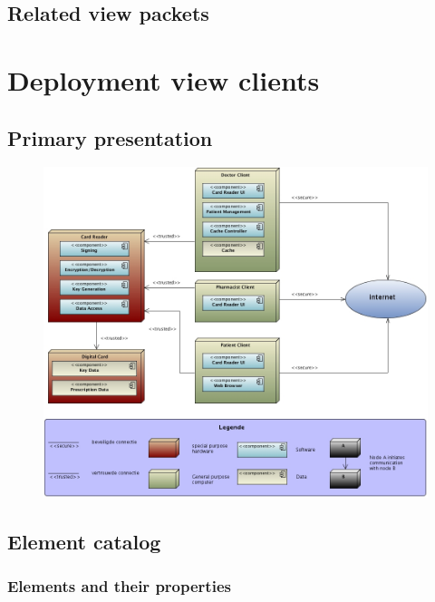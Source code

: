 \documentclass[a4paper,10pt]{paper}
\begin{document}
\subsection{Related view packets}


\section{Deployment view clients}

\subsection{Primary presentation}
\begin{center}
    \begin{figure}
      \includegraphics[width=\textwidth]{../images/deployment_clients.jpg}
    \end{figure}
  \end{center}

\subsection{Element catalog}

\subsubsection{Elements and their properties}
\end{document}
